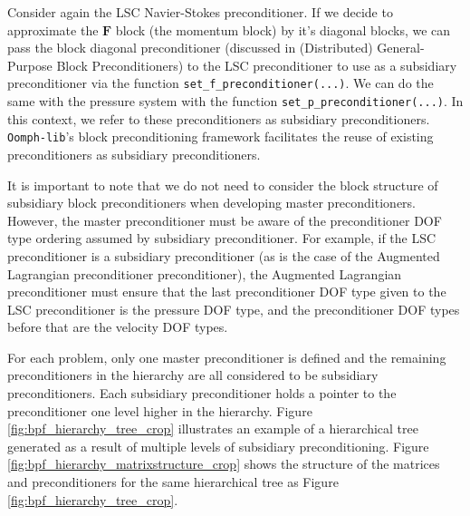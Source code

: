 Consider again the LSC Navier-Stokes preconditioner. If we decide to approximate
the $\mathbf{F}$ block (the momentum block) by it's diagonal blocks, we can 
pass the block diagonal preconditioner (discussed in (Distributed) 
General-Purpose Block Preconditioners) to the LSC preconditioner to use as a 
subsidiary preconditioner via the function 
\texttt{set\_\allowbreak f\_\allowbreak preconditioner(...)}. We can do the 
same with the pressure system with the function 
\texttt{set\_\allowbreak p\_\allowbreak preconditioner(...)}. In this context, 
we refer to these preconditioners as subsidiary preconditioners. 
\texttt{Oomph-lib}'s block preconditioning framework facilitates the reuse of 
existing preconditioners as subsidiary preconditioners.

It is important to note that we do not need to consider the block structure of
subsidiary block preconditioners when developing master preconditioners.
However, the master preconditioner must be aware of the preconditioner DOF type
ordering assumed by subsidiary preconditioner. For example, if the LSC
preconditioner is a subsidiary preconditioner (as is the case of the Augmented
Lagrangian preconditioner preconditioner), the Augmented Lagrangian
preconditioner must ensure that the last preconditioner DOF type given to the
LSC preconditioner is the pressure DOF type, and the preconditioner DOF types
before that are the velocity DOF types.

For each problem, only one master preconditioner is defined and the remaining
preconditioners in the hierarchy are all considered to be subsidiary
preconditioners. Each subsidiary preconditioner holds a pointer to the
preconditioner one level higher in the hierarchy. Figure
\ref{fig:bpf_hierarchy_tree_crop} illustrates an example of a hierarchical tree
generated as a result of multiple levels of subsidiary preconditioning. Figure
\ref{fig:bpf_hierarchy_matrixstructure_crop} shows the structure of the
matrices and preconditioners for the same hierarchical tree as Figure
\ref{fig:bpf_hierarchy_tree_crop}.

